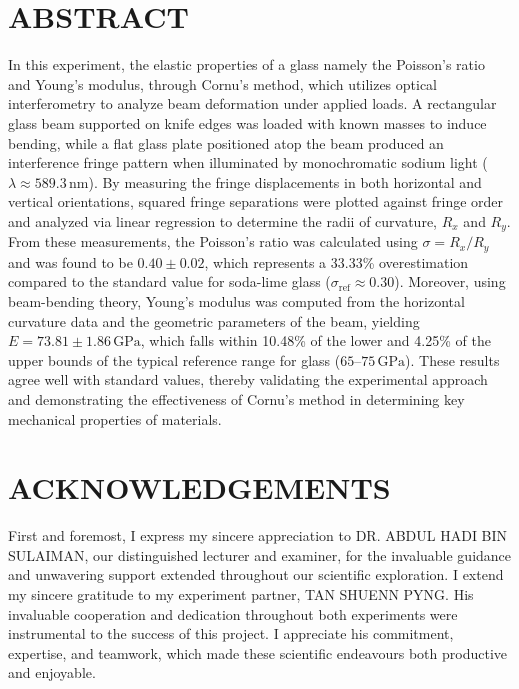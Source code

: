 \documentclass[a4paper,11pt]{article}
\begin{document}
\section*{\large \center ABSTRACT}
\label{sec:ABSTRACT}

\qquad In this experiment, the elastic properties of a glass  namely the Poisson's ratio and Young's modulus, through Cornu's method, which utilizes optical interferometry to analyze beam deformation under applied loads. A rectangular glass beam supported on knife edges was loaded with known masses to induce bending, while a flat glass plate positioned atop the beam produced an interference fringe pattern when illuminated by monochromatic sodium light (\(\lambda \approx 589.3\,\mathrm{nm}\)). By measuring the fringe displacements in both horizontal and vertical orientations, squared fringe separations were plotted against fringe order and analyzed via linear regression to determine the radii of curvature, \(R_x\) and \(R_y\). From these measurements, the Poisson's ratio was calculated using \(\sigma = R_x/R_y\) and was found to be \(0.40 \pm 0.02\), which represents a 33.33\% overestimation compared to the standard value for soda-lime glass (\(\sigma_\text{ref} \approx 0.30\)). Moreover, using beam-bending theory, Young's modulus was computed from the horizontal curvature data and the geometric parameters of the beam, yielding \(E = 73.81 \pm 1.86\,\mathrm{GPa}\), which falls within 10.48\% of the lower and 4.25\% of the upper bounds of the typical reference range for glass (\(65\)--\(75\,\mathrm{GPa}\)). These results agree well with standard values, thereby validating the experimental approach and demonstrating the effectiveness of Cornu's method in determining key mechanical properties of materials.


\newpage 
{}
\section*{\large \center ACKNOWLEDGEMENTS}
\label{sec:ACKNOWLEDGEMENTS}
\indent

First and foremost, I express my sincere appreciation to DR. ABDUL HADI BIN SULAIMAN, our distinguished lecturer and examiner, for the invaluable guidance and unwavering support extended throughout our scientific exploration. I extend my sincere gratitude to my experiment partner, TAN SHUENN PYNG. His invaluable cooperation and dedication throughout both experiments were instrumental to the success of this project. I appreciate his commitment, expertise, and teamwork, which made these scientific endeavours both productive and enjoyable.
\end{document}
